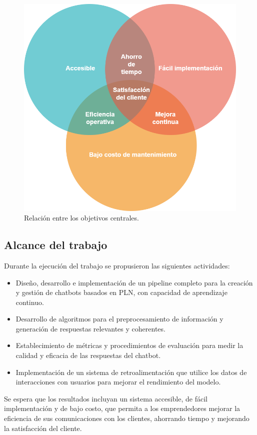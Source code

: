 \begin{figure}[htbp]
  \centering
  \includegraphics[width=.5\textwidth]{./Figures/Venn_objetivos.png}
  \caption{Relación entre los objetivos centrales.}
  \label{fig:objetivos_venn}
\end{figure}

\subsection{Alcance del trabajo}

Durante la ejecución del trabajo se propusieron las siguientes actividades:

\begin{itemize}
    \item Diseño, desarrollo e implementación de un pipeline completo para la creación y gestión de chatbots basados en PLN, con capacidad de aprendizaje continuo.
    \item Desarrollo de algoritmos para el preprocesamiento de información y generación de respuestas relevantes y coherentes.
    \item Establecimiento de métricas y procedimientos de evaluación para medir la calidad y eficacia de las respuestas del chatbot.
    \item Implementación de un sistema de retroalimentación que utilice los datos de interacciones con usuarios para mejorar el rendimiento del modelo.
\end{itemize}

Se espera que los resultados incluyan un sistema accesible, de fácil implementación y de bajo costo, que permita a los emprendedores mejorar la eficiencia de sus comunicaciones con los clientes, ahorrando tiempo y mejorando la satisfacción del cliente.




